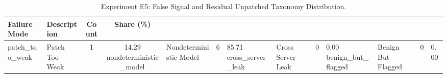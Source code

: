 \begin{table}[h]
\centering
\caption{Experiment E5: False Signal and Residual Unpatched Taxonomy Distribution.}
\label{tab:e5_taxonomy}
\small
\begin{tabular}{llcc}
\hline
\textbf{Failure Mode} & \textbf{Description} & \textbf{Count} & \textbf{Share (\%)} \\
\hline
patch_too_weak & Patch Too Weak & 1 & 14.29%
nondeterministic_model & Nondeterministic Model & 6 & 85.71%
cross_server_leak & Cross Server Leak & 0 & 0.00%
benign_but_flagged & Benign But Flagged & 0 & 0.00%
\hline
\end{tabular}
\end{table}
